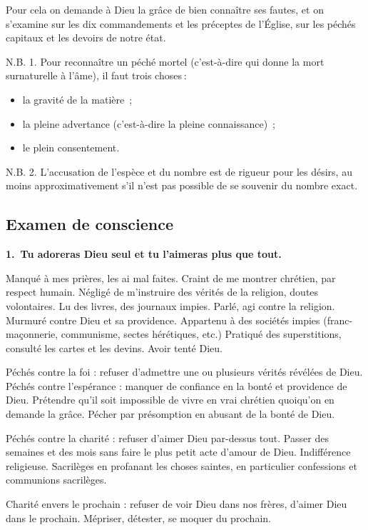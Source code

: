 \documentclass[%
a5paper%
,11pt%
,DIV=15%
,titlepage=on%
,headings=optiontoheadandtoc%
,headings=small%
,parskip=false%
,openany%
]{scrbook}
\newcommand{\commandement}[1]{\noindent\textbf{#1}}
\begin{document}
Pour cela on demande à Dieu la grâce de bien connaître ses fautes, et on s’examine sur les dix commandements et les préceptes de l’Église, sur les péchés capitaux et les devoirs de notre état.

N.B. 1. Pour reconnaître un péché mortel (c’est-à-dire qui donne la mort surnaturelle à l’âme), il faut trois choses :
\begin{itemize}
\item la gravité de la matière ;
\item la pleine advertance (c’est-à-dire la pleine connaissance) ;
\item le plein consentement.
\end{itemize}

N.B. 2. L’accusation de l’espèce et du nombre est de rigueur pour les désirs, au moins approximativement s'il n'est pas possible de se souvenir du nombre exact.


\subsection*{Examen de conscience}


\commandement{1. Tu adoreras Dieu seul et tu l'aimeras plus que tout.}

Manqué à mes prières, les ai mal faites.
Craint de me montrer chrétien, par respect humain. Négligé de m’instruire des
vérités de la religion, doutes volontaires.
Lu des livres, des journaux impies. Parlé,
agi contre la religion. Murmuré contre
Dieu et sa providence. Appartenu à des
sociétés impies (franc-maçonnerie, communisme, sectes hérétiques, etc.) Pratiqué
des superstitions, consulté les cartes et les
devins. Avoir tenté Dieu.

Péchés contre la foi : refuser d’admettre
une ou plusieurs vérités révélées de Dieu.
Péchés contre l’espérance : manquer de
confiance en la bonté et providence de
Dieu. Prétendre qu’il soit impossible de
vivre en vrai chrétien quoiqu’on en demande la grâce. Pécher par présomption
en abusant de la bonté de Dieu.

Péchés contre la charité : refuser d’aimer
Dieu par-dessus tout. Passer des semaines
et des mois sans faire le plus petit acte
d’amour de Dieu. Indifférence religieuse.
Sacrilèges en profanant les choses saintes,
en particulier confessions et communions
sacrilèges.

Charité envers le prochain : refuser de
voir Dieu dans nos frères, d’aimer Dieu
dans le prochain. Mépriser, détester, se
moquer du prochain.
\end{document}

